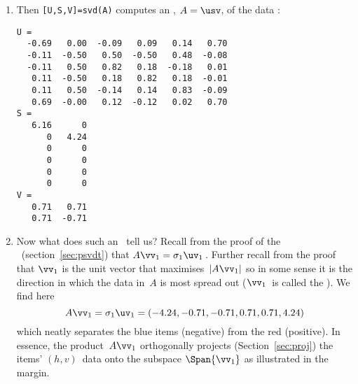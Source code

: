 \begin{example}
\begin{solution}
\begin{enumerate}
\item Then \verb|[U,S,V]=svd(A)| computes an \svd, \(A=\usv\), of the data \twodp:
\begin{verbatim}
U =
  -0.69   0.00  -0.09   0.09   0.14   0.70
  -0.11  -0.50   0.50  -0.50   0.48  -0.08
  -0.11   0.50   0.82   0.18  -0.18   0.01
   0.11  -0.50   0.18   0.82   0.18  -0.01
   0.11   0.50  -0.14   0.14   0.83  -0.09
   0.69  -0.00   0.12  -0.12   0.02   0.70
S =
   6.16      0
      0   4.24
      0      0
      0      0
      0      0
      0      0
V =
   0.71   0.71
   0.71  -0.71
\end{verbatim}

\item Now what does such an \svd\ tell us?
Recall from the proof of the \svd\ (section~\ref{sec:psvdt}) that \(A\vv_1=\sigma_1\uv_1\)\,. 
Further recall from the proof that \(\vv_1\) is the unit vector that maximises~\(|A\vv_1|\) so in some sense it is the direction in which the data in~\(A\) is most spread out (\(\vv_1\)~is called the ).
We find here \twodp
{}%
\begin{equation*}
A\vv_1=\sigma_1\uv_1=(-4.24,-0.71,-0.71,0.71,0.71,4.24)
\end{equation*}
which neatly separates the blue items (negative) from the red (positive).
In essence, the product~\(A\vv_1\) orthogonally projects (Section~\ref{sec:proj}) the items' \((h,v)\)~data onto the subspace \(\Span\{\vv_1\}\) as illustrated in the margin. 
\end{enumerate}
\end{solution}
\end{example}

